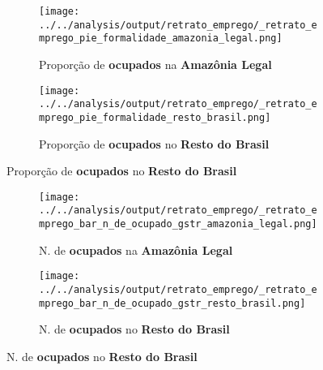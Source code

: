 \documentclass[11pt]{beamer}
\begin{document}
\begin{frame}[label=_retrato_emprego_pie_formalidade]{}
\textit{\hyperlink{indice_principal}{}}
\begin{figure}
\centering
\begin{subfigure}{.5\textwidth}
  \centering
  \texttt{[image: ../../analysis/output/retrato\_emprego/\_retrato\_emprego\_pie\_formalidade\_amazonia\_legal.png]}
  \label{fig:_retrato_emprego_pie_formalidade_amazonia_legal}
  \caption{{\tiny Proporção de \textbf{ocupados} na \textbf{Amazônia Legal}}}
\end{subfigure}%
\begin{subfigure}{.5\textwidth}
  \centering
  \texttt{[image: ../../analysis/output/retrato\_emprego/\_retrato\_emprego\_pie\_formalidade\_resto\_brasil.png]}
  \label{fig:_retrato_emprego_pie_formalidade_resto_brasil}
   \caption{{\tiny Proporção de \textbf{ocupados} no \textbf{Resto do Brasil}}}
\end{subfigure}
\end{figure}
\end{frame}


\begin{frame}[label=_retrato_emprego_bar_n_de_ocupado_gstr]{}
\textit{\hyperlink{indice_principal}{}}
\begin{figure}
\centering
\begin{subfigure}{.5\textwidth}
  \centering
  \texttt{[image: ../../analysis/output/retrato\_emprego/\_retrato\_emprego\_bar\_n\_de\_ocupado\_gstr\_amazonia\_legal.png]}
  \label{fig:_retrato_emprego_bar_n_de_ocupado_gstr_amazonia_legal}
  \caption{{\tiny N. de \textbf{ocupados} na \textbf{Amazônia Legal}}}
\end{subfigure}%
\begin{subfigure}{.5\textwidth}
  \centering
  \texttt{[image: ../../analysis/output/retrato\_emprego/\_retrato\_emprego\_bar\_n\_de\_ocupado\_gstr\_resto\_brasil.png]}
  \label{fig:_retrato_emprego_bar_n_de_ocupado_gstr_resto_brasil}
   \caption{{\tiny N. de \textbf{ocupados} no \textbf{Resto do Brasil}}}
\end{subfigure}
\end{figure}
\end{frame}
\end{document}
